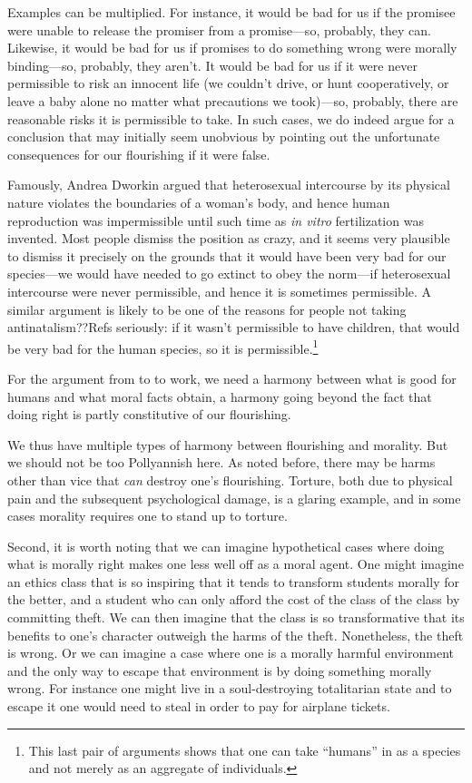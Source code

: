 Examples can be multiplied. For instance, it would be bad for us if the promisee were unable to release the
promiser from a promise---so, probably, they can. Likewise, it would be bad for us if promises to do something 
wrong were morally binding---so, probably, they aren't. It would be bad for us if it were never permissible 
to risk an innocent life (we couldn't drive, or hunt cooperatively, or leave a baby alone no matter what precautions
we took)---so, probably, there are reasonable risks it is permissible to take. In such cases, we do indeed argue
for a conclusion that may initially seem unobvious by pointing out the unfortunate consequences for our flourishing
if it were false. 

Famously, Andrea Dworkin argued that heterosexual intercourse by its physical nature violates the boundaries of
a woman's body, and hence human reproduction was impermissible until such time as \textit{in vitro} fertilization
was invented. Most people dismiss the position as crazy, and it seems very plausible to dismiss it precisely on the grounds
that it would have been very bad for our species---we would have needed to go extinct to obey the norm---if heterosexual intercourse were 
never permissible, and hence it is sometimes permissible. A similar argument is likely to be one of the
reasons for people not taking antinatalism??Refs seriously: if it wasn't permissible to have children, that would be
very bad for the human species, so it is permissible.\footnote{This last pair of arguments shows that one can
take ``humans'' in  as a species and not merely as an aggregate of individuals.}

For the argument from  to  to work, we need a harmony between what is good for humans
and what moral facts obtain, a harmony going beyond the fact that doing right is partly constitutive of our flourishing.

We thus have multiple types of harmony between flourishing and morality.
But we should not be too Pollyannish here. As noted before, there may 
be harms other than vice that \textit{can} destroy one's flourishing. Torture, both due to physical pain and the subsequent 
psychological damage, is a glaring example, and in some cases morality requires one to stand up to torture. 

Second, it is worth noting that we can imagine hypothetical cases where doing what is morally right makes one less 
well off as a moral agent. One might imagine an ethics class that is so inspiring that it tends to 
transform students morally for the better, and a student who can only afford the cost of the class of the class by 
committing theft. We can then imagine that the class is so transformative that its benefits to one's character outweigh
the harms of the theft. Nonetheless, the theft is wrong. Or we can imagine a case where one is a morally harmful 
environment and the only way to escape that environment is by doing something morally wrong. For instance one might 
live in a soul-destroying totalitarian state and to escape it one would need to steal in order to pay for airplane 
tickets.

